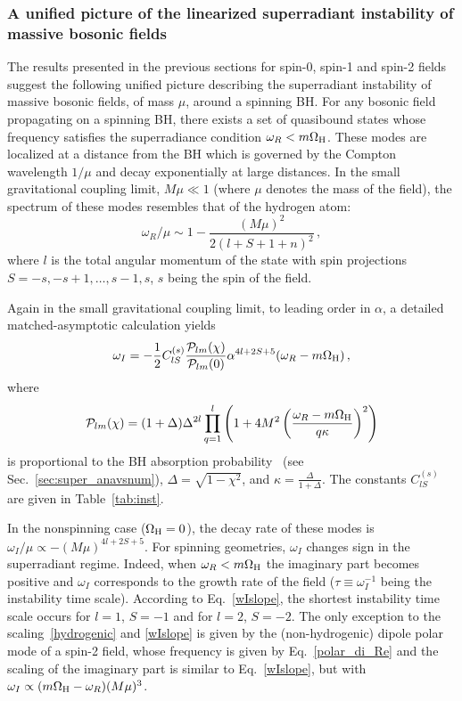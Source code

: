 \documentclass[11pt]{article}
\newcommand{\be}{\begin{equation}}
\newcommand{\ee}{\end{equation}}
\numberwithin{equation}{section} %
\begin{document}
\subsubsection{A unified picture of the linearized superradiant instability of massive bosonic fields} 
\label{sec:massive_unified}
The results presented in the previous sections for spin-0, spin-1 and spin-2 fields suggest the following unified picture describing the superradiant instability of massive bosonic fields, of mass $\mu$, around a spinning BH. For any bosonic field propagating on a spinning BH, there exists a set of quasibound states whose frequency satisfies the superradiance condition $\omega_R<m\Omega_{\rm H}$. These modes are localized at a distance from the BH which is governed by the Compton wavelength $1/\mu$ and decay exponentially at large distances. In the small gravitational coupling limit, $M\mu\ll1$ (where $\mu$ denotes the mass of the field), the spectrum of these modes resembles that of the hydrogen atom: 
%
\be
\omega_R/\mu \sim 1-\frac{(M\mu)^2}{2(l+S+1+n)^2}\,, \label{hydrogenic}
\ee
%
where $l$ is the total angular momentum of the state with spin projections $S=-s,-s+1,\ldots,s-1,s$, $s$ being the spin of the field. 


Again in the small gravitational coupling limit, to leading order in $\alpha$, a detailed matched-asymptotic 
calculation 
yields~\cite{Detweiler:1980uk,Baryakhtar:2017ngi,Baumann:2019eav,Brito:2020lup}
%
\begin{equation}
\omega_I=-\frac{1}{2}C^{(s)}_{lS}\frac{{\cal P}_{lm}(\chi)}{{\cal P}_{lm}(0)}\alpha^{4l+2S+5}
(\omega_R-m\Omega_{\rm H})\,, \label{wIslope}
\end{equation}
% 
where 
\begin{equation}
 {\cal P}_{lm}(\chi)=(1+\Delta)\Delta^{2l}\prod_{q=1}^l\left(1+4M^2\left(\frac{\omega_R-m\Omega_{\rm 
H}}{q\kappa}\right)^2\right)
\end{equation}
is proportional to the BH absorption probability~\cite{Starobinski:1973,Starobinski2:1973} (see 
Sec.~\ref{sec:super_anavsnum}), $\Delta=\sqrt{1-\chi^2}$, and $\kappa=\frac{\Delta}{1+\Delta}$.
%
The constants $C^{(s)}_{lS}$ are given in Table~\ref{tab:inst}.

In the nonspinning case ($\Omega_{\rm H}=0$), the decay rate of these modes is $\omega_I/\mu\propto -(M\mu)^{4l+2S+5}$.
For spinning geometries, $\omega_I$ changes sign in the superradiant regime. Indeed, 
when $\omega_R<m\Omega_{\rm H}$ the imaginary part becomes positive and $\omega_I$ corresponds to the growth rate of 
the field ($\tau\equiv\omega_I^{-1}$ being the instability time scale). According to Eq.~\eqref{wIslope}, the shortest 
instability time scale occurs for $l=1$, $S=-1$ and for $l=2$, $S=-2$. The only exception to the 
scaling~\eqref{hydrogenic} and 
\eqref{wIslope} is given by the (non-hydrogenic) dipole polar mode of a spin-2 field, whose frequency is given by 
Eq.~\eqref{polar_di_Re} 
and the scaling of the imaginary part is similar to Eq.~\eqref{wIslope}, but with $\omega_I\propto (m\Omega_{\rm 
H}-\omega_R)(M\mu)^{3}$.
\end{document}
